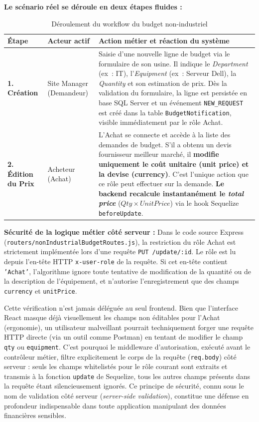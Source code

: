\textbf{Le scénario réel se déroule en deux étapes fluides :}

\begin{table}[h]
\centering
\begin{tabular}{|p{2cm}|p{3.5cm}|p{9.5cm}|}
\hline
\textbf{Étape} & \textbf{Acteur actif} & \textbf{Action métier et réaction du système} \\ \hline
\textbf{1. Création} & Site Manager (Demandeur) & Saisie d'une nouvelle ligne de budget via le formulaire de son usine. Il indique le \textit{Department} (ex~: IT), l'\textit{Equipment} (ex~: Serveur Dell), la \textit{Quantity} et son estimation de prix. Dès la validation du formulaire, la ligne est persistée en base SQL Server et un événement \texttt{NEW\_REQUEST} est créé dans la table \texttt{BudgetNotification}, visible immédiatement par le rôle Achat. \\ \hline
\textbf{2. Édition du Prix} & Acheteur (Achat) & L'Achat se connecte et accède à la liste des demandes de budget. S'il a obtenu un devis fournisseur meilleur marché, il \textbf{modifie uniquement le coût unitaire (unit price) et la devise (currency)}. C'est l'unique action que ce rôle peut effectuer sur la demande. \textbf{Le backend recalcule instantanément le \textit{total price}} ($Qty \times UnitPrice$) via le hook Sequelize \texttt{beforeUpdate}. \\ \hline
\end{tabular}
\caption{Déroulement du workflow du budget non-industriel}
\label{tab:workflow_budget}
\end{table}

\textbf{Sécurité de la logique métier côté serveur :}
Dans le code source Express (\texttt{routers/nonIndustrialBudgetRoutes.js}), la restriction du rôle Achat est strictement implémentée lors d'une requête \texttt{PUT /update/:id}. Le rôle est lu depuis l'en-tête HTTP \texttt{x-user-role} de la requête. Si cet en-tête contient \texttt{'Achat'}, l'algorithme ignore toute tentative de modification de la quantité ou de la description de l'équipement, et n'autorise l'enregistrement que des champs \texttt{currency} et \texttt{unitPrice}.

Cette vérification n'est jamais déléguée au seul frontend. Bien que l'interface React masque déjà visuellement les champs non éditables pour l'Achat (ergonomie), un utilisateur malveillant pourrait techniquement forger une requête HTTP directe (via un outil comme Postman) en tentant de modifier le champ \texttt{qty} ou \texttt{equipment}. C'est pourquoi le middleware d'autorisation, exécuté avant le contrôleur métier, filtre explicitement le corps de la requête (\texttt{req.body}) côté serveur : seuls les champs whitelistés pour le rôle courant sont extraits et transmis à la fonction \texttt{update} de Sequelize, tous les autres champs présents dans la requête étant silencieusement ignorés. Ce principe de sécurité, connu sous le nom de validation côté serveur (\textit{server-side validation}), constitue une défense en profondeur indispensable dans toute application manipulant des données financières sensibles.

